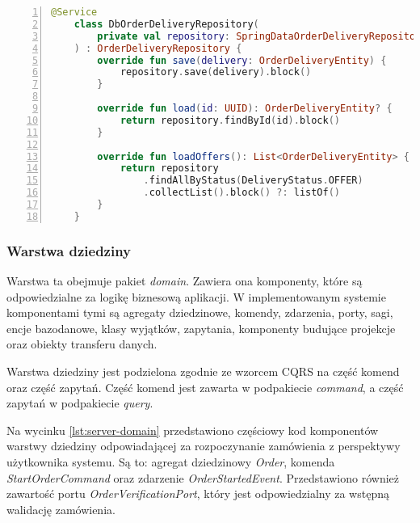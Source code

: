 \begin{lstlisting}[caption={Kod implementacji repozytorium dziedzinowego projekcji Zamówienia},label={lst:server-out-adapter},captionpos=b,language=Kotlin,numbers=left]
    @Service
    class DbOrderDeliveryRepository(
        private val repository: SpringDataOrderDeliveryRepository
    ) : OrderDeliveryRepository {
        override fun save(delivery: OrderDeliveryEntity) {
            repository.save(delivery).block()
        }
    
        override fun load(id: UUID): OrderDeliveryEntity? {
            return repository.findById(id).block()
        }
    
        override fun loadOffers(): List<OrderDeliveryEntity> {
            return repository
                .findAllByStatus(DeliveryStatus.OFFER)
                .collectList().block() ?: listOf()
        }
    }
\end{lstlisting}

\subsubsection{Warstwa dziedziny} 

Warstwa ta obejmuje pakiet \textit{domain}. Zawiera ona komponenty, które są odpowiedzialne za logikę biznesową aplikacji. W implementowanym systemie komponentami tymi są agregaty dziedzinowe, komendy, zdarzenia, porty, sagi, encje bazodanowe, klasy wyjątków, zapytania, komponenty budujące projekcje oraz obiekty transferu danych.

Warstwa dziedziny jest podzielona zgodnie ze wzorcem CQRS na część komend oraz część zapytań. Część komend jest zawarta w podpakiecie \textit{command}, a część zapytań w podpakiecie \textit{query}.

Na wycinku \ref{lst:server-domain} przedstawiono częściowy kod komponentów warstwy dziedziny odpowiadającej za rozpoczynanie zamówienia z perspektywy użytkownika systemu. Są to: agregat dziedzinowy \textit{Order}, komenda \textit{StartOrderCommand} oraz zdarzenie \textit{OrderStartedEvent}. Przedstawiono również zawartość portu \textit{OrderVerificationPort}, który jest odpowiedzialny za wstępną walidację zamówienia.

